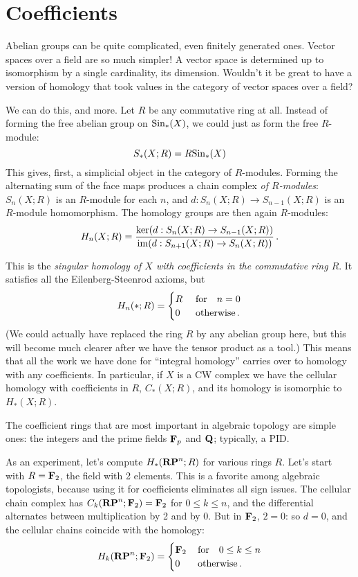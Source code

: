 \section{Coefficients}

Abelian groups can be quite complicated, even finitely generated ones. Vector spaces over a field are so much simpler! A vector space is determined up to isomorphism by a single cardinality, its dimension. Wouldn't it be great to have a version of homology that took values in the category of vector spaces over a field? 

We can do this, and more. Let $R$ be any commutative ring at all.
Instead of forming the free abelian group on $\mathrm{Sin}_*(X)$, we could just as 
form the free $R$-module:
\[
S_*(X;R)=R\mathrm{Sin}_*(X)
\]
This gives, first, a simplicial object in the category of $R$-modules.
Forming the alternating sum of the face maps produces a chain complex 
{\em of $R$-modules}: $S_n(X;R)$ is an $R$-module for each $n$, and 
$d:S_n(X;R)\to S_{n-1}(X;R)$ is an $R$-module homomorphism. The homology
groups are then again $R$-modules:
\[
H_n(X;R)=\frac{\ker(d:S_n(X;R)\to S_{n-1}(X;R))}
{\operatorname{im}(d:S_{n+1}(X;R)\to S_n(X;R))}\,.
\]

This is the {\em singular homology of $X$ with coefficients in the commutative 
ring $R$}. It satisfies all the Eilenberg-Steenrod axioms, but 
\[
H_n(\ast;R)=
\begin{cases}R\,\,&\hbox{for}\quad n=0\\0\,\,&\hbox{otherwise}\,.\end{cases}
\]
(We could actually have replaced the ring $R$ by any abelian group here, 
but this will become much clearer after we have the tensor product as a tool.)
This means that all the work we have done for ``integral homology'' carries
over to homology with any coefficients. In particular, if $X$ is a CW complex
we have the cellular homology with coefficients in $R$, $C_*(X;R)$, and its
homology is isomorphic to $H_*(X;R)$. 

The coefficient rings that are most important in algebraic topology are 
simple ones: the integers and the prime fields $\mathbf F_p$ and $\mathbf Q$; 
typically, a PID.

As an experiment, let's compute $ H_\ast(\mathbf{RP}^n;R)$ for various rings $R$.
Let's start with $R=\mathbf F_2$, the field with 2 elements. This is a favorite
among algebraic topologists, because using it for coefficients eliminates 
all sign issues. The cellular chain complex has $C_k(\mathbf{RP}^n;\mathbf F_2)=\mathbf F_2$ for 
$0\leq k\leq n$, and the differential alternates between multiplication by 
2 and by 0. But in $\mathbf F_2$, $2=0$: so $d=0$, and the cellular chains
coincide with the homology:
\[
H_k(\mathbf{RP}^n;\mathbf F_2)=
\begin{cases}\mathbf F_2\,&\hbox{for}\quad 0\leq k\leq n\\0\,\,&\hbox{otherwise}\,.
\end{cases}
\]

